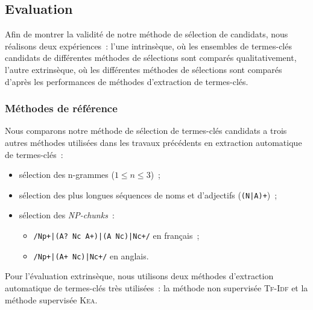     \subsection{Evaluation}
    \label{subsec:main-automatic_keyphrase_annotation-keyphrase_candidate_selection-evaluation}
      Afin de montrer la validité de notre méthode de sélection de candidats,
      nous réalisons deux expériences~: l'une intrinsèque, où les ensembles de
      termes-clés candidats de différentes méthodes de sélections sont comparés
      qualitativement, l'autre extrinsèque, où les différentes méthodes de
      sélections sont comparés d'après les performances de méthodes d'extraction
      de termes-clés.

      \subsubsection{Méthodes de référence}
      \label{subsubsec:main-automatic_keyphrase_annotation-keyphrase_candidate_selection-evaluation-baselines}
        Nous comparons notre méthode de sélection de termes-clés candidats a
        trois autres méthodes utilisées dans les travaux précédents en
        extraction automatique de termes-clés~:
        \begin{itemize}
          \item{sélection des n-grammes ($1 \leq n \leq 3$)~;}
          \item{sélection des plus longues séquences de noms et d'adjectifs
                (\texttt{(N|A)+})~;}
          \item{sélection des \textit{NP-chunks}~:}
          \begin{itemize}
            \item{\texttt{/Np+|(A? Nc A+)|(A Nc)|Nc+/} en français~;}
            \item{\texttt{/Np+|(A+ Nc)|Nc+/} en anglais.}
          \end{itemize}
        \end{itemize}

        Pour l'évaluation extrinsèque, nous utilisons deux méthodes d'extraction
        automatique de termes-clés très utilisées~: la méthode non supervisée
        \textsc{Tf-Idf} et la méthode supervisée \textsc{Kea}. 

